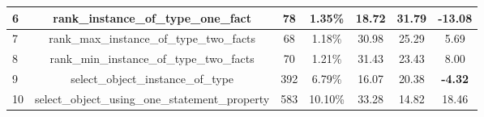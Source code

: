 \begin{table}[]
{\begin{tabular}{|l|c|cc|cc|c|}
    6                            & rank\_instance\_of\_type\_one\_fact                                                                                    & 78                                                  & 1.35\%                                                                          & 18.72                                                                                                      & 31.79                                                                                  & \textbf{-13.08}                                                                    \\ \hline
    7                            & rank\_max\_instance\_of\_type\_two\_facts                                                                              & 68                                                  & 1.18\%                                                                          & 30.98                                                                                                      & 25.29                                                                                  & 5.69                                                                               \\ \hline
    8                            & rank\_min\_instance\_of\_type\_two\_facts                                                                              & 70                                                  & 1.21\%                                                                          & 31.43                                                                                                      & 23.43                                                                                  & 8.00                                                                               \\ \hline
    9                            & select\_object\_instance\_of\_type                                                                                     & 392                                                 & 6.79\%                                                                          & 16.07                                                                                                      & 20.38                                                                                  & \textbf{-4.32}                                                                     \\ \hline
    10                           & select\_object\_using\_one\_statement\_property                                                                        & 583                                                 & 10.10\%                                                                         & 33.28                                                                                                      & 14.82                                                                                  & 18.46                                                                              \\ \hline

\end{tabular}}
\end{table}
